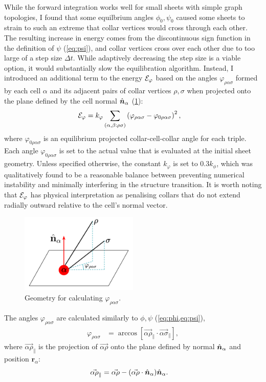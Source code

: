 While the forward integration works well for small sheets with simple graph topologies, I found that some equilbrium angles $\phi_0, \psi_0$ caused some sheets to strain to such an extreme that collar vertices would cross through each other. 
The resulting increase in energy comes from the discontinuous sign function in the definition of $\psi$ (\cref{eq:psi}), and collar vertices cross over each other due to too large of a step size $\Delta t$. 
While adaptively decreasing the step size is a viable option, it would substantially slow the equilibration algorithm.  
Instead, I introduced an additional term to the energy $\mathcal{E}_\varphi$ based on the angles $\varphi_{\rho\alpha\sigma}$ formed by each cell $\alpha$ and its adjacent pairs of collar vertices $\rho,\sigma$ when projected onto the plane defined by the cell normal $\hat{\bm{n}}_\alpha$ (\cref{fig:varphi}):
\begin{align}
	\mathcal{E}_\varphi &= k_\varphi \sum_{(\alpha,\beta:\rho\sigma)} \left(\varphi_{\rho\alpha\sigma} - \varphi_{0\rho\alpha\sigma} \right)^2, \label{eq:e_varphi}
\end{align}
\noindent where $\varphi_{0\rho\alpha\sigma}$ is an equilibrium projected collar-cell-collar angle for each triple. 
Each angle $\varphi_{0\rho\alpha\sigma}$ is set to the actual value that is evaluated at the initial sheet geometry.
Unless specified otherwise, the constant $k_\varphi$ is set to $0.3k_\phi$, which was qualitatively found to be a reasonable balance between preventing numerical instability and minimally interfering in the structure transition.
It is worth noting that $\mathcal{E}_\varphi$ has physical interpretation as penalising collars that do not extend radially outward relative to the cell's normal vector.

\begin{figure}
	\centering 
	\includegraphics[width=0.5\textwidth]{varphi.png}
	\caption{Geometry for calculating $\varphi_{\rho\alpha\sigma}$.}
	\label{fig:varphi}
\end{figure}

The angles $\varphi_{\rho\alpha\sigma}$ are calculated similarly to $\phi, \psi$ (\cref{eq:phi,eq:psi}),
\begin{align}
	\varphi_{\rho\alpha\sigma} &= \arccos \left[\vec{\alpha\rho}_\| \cdot \vec{\alpha\sigma}_\| \right], \label{eq:varphi}
\end{align}
\noindent where $\vec{\alpha\rho}_\|$ is the projection of $\vec{\alpha\rho}$ onto the plane defined by normal $\hat{\bm{n}}_\alpha$ and position $\bm{r}_\alpha$:
\begin{align*}
\vec{\alpha\rho}_{\|} &= \vec{\alpha\rho} - (\vec{\alpha\rho} \cdot \hat{\bm{n}}_\alpha) \hat{\bm{n}}_\alpha.
\end{align*}


